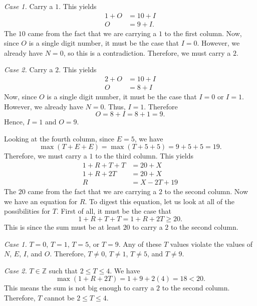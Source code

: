 \documentclass[12pt]{article}
\begin{document}
\noindent\textit{Case 1.} Carry a $1$. This yields
\begin{align*}
    1+O&=10+I\\
    O&=9+I.
\end{align*}
The $10$ came from the fact that we are carrying a $1$ to the first column. Now, since $O$ is a single digit number, it must be the case that $I=0$. However, we already have $N=0$, so this is a contradiction. Therefore, we must carry a $2$.
\vspace{20px}

\noindent\textit{Case 2.} Carry a $2$. This yields
\begin{align*}
    2+O&=10+I\\
    O&=8+I
\end{align*}
Now, since $O$ is a single digit number, it must be the case that $I=0$ or $I=1$. However, we already have $N=0$. Thus, $I=1$. Therefore
\[O=8+I=8+1=9.\]
Hence, $\boxed{I=1}$ and $\boxed{O=9}$.
\newpage

\noindent Looking at the fourth column, since $E=5$, we have
\[\max(T+E+E)=\max(T+5+5)=9+5+5=19.\]
Therefore, we must carry a $1$ to the third column. This yields
\begin{align*}
    1+R+T+T&=20+X\\
    1+R+2T&=20+X\\
    R&=X-2T+19
\end{align*}
The $20$ came from the fact that we are carrying a $2$ to the second column. Now we have an equation for $R$. To digest this equation, let us look at all of the possibilities for $T$. First of all, it must be the case that
\[1+R+T+T=1+R+2T\geq 20.\]
This is since the sum must be at least $20$ to carry a $2$ to the second column.
\vspace{20px}

\noindent\textit{Case 1.} $T=0$, $T=1$, $T=5$, or $T=9$. Any of these $T$ values violate the values of $N$, $E$, $I$, and $O$. Therefore, $T\neq 0$, $T\neq 1$, $T\neq 5$, and $T\neq 9$.
\vspace{20px}

\noindent\textit{Case 2.} $T\in\mathbb{Z}$ such that $2\leq T\leq 4$. We have
\[\max(1+R+2T)=1+9+2(4)=18<20.\]
This means the sum is not big enough to carry a $2$ to the second column. Therefore, $T$ cannot be $2\leq T\leq 4$.
\vspace{20px}
\end{document}
